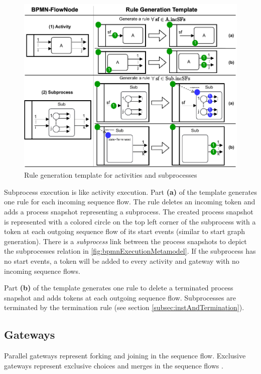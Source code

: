 \documentclass{lmcs} %
\begin{document}
\begin{figure}[ht]
    \centering
    \includegraphics[width=1\textwidth]{images/activities_template.pdf}
    \caption{Rule generation template for activities and subprocesses}
    \label{fig:activityTemplates}
\end{figure}

Subprocess execution is like activity execution.
Part \textbf{(a)} of the template generates one rule for each incoming sequence flow.
The rule deletes an incoming token and adds a process snapshot representing a subprocess. 
The created process snapshot is represented with a colored circle on the top left corner of the subprocess with a token at each outgoing sequence flow of its start events (similar to start graph generation).
There is a \textit{subprocess} link between the process snapshots to depict the \textsf{subprocesses} relation in \autoref{fig:bpmnExecutionMetamodel}.
If the subprocess has no start events, a token will be added to every activity and gateway with no incoming sequence flows.

Part \textbf{(b)} of the template generates one rule to delete a terminated process snapshot and adds tokens at each outgoing sequence flow.
Subprocesses are terminated by the termination rule (see section \ref{subsec:instAndTermination}).

\subsection{Gateways}
Parallel gateways represent forking and joining in the sequence flow.
Exclusive gateways represent exclusive choices and merges in the sequence flows \cite{objectmanagementgroupBusinessProcessModel2013}.
\end{document}
